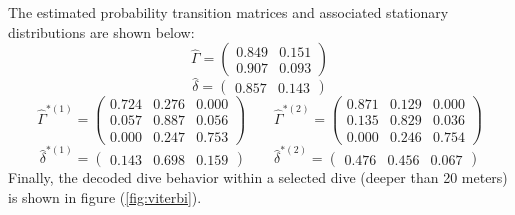 %
The estimated probability transition matrices and associated stationary distributions are shown below:
%
$$\hat \Gamma = \begin{pmatrix} 
0.849 & 0.151 \\
0.907 & 0.093
\end{pmatrix}$$
$$\hat \delta = \begin{pmatrix} 0.857 & 0.143 \end{pmatrix}$$
%
$$\hat \Gamma^{*(1)} = \begin{pmatrix} 
0.724 & 0.276 & 0.000 \\
0.057 & 0.887 & 0.056 \\
0.000 & 0.247 & 0.753
\end{pmatrix} \qquad 
\hat \Gamma^{*(2)} = \begin{pmatrix} 
0.871 & 0.129 & 0.000 \\
0.135 & 0.829 & 0.036 \\
0.000 & 0.246 & 0.754
\end{pmatrix}$$
$$\hat \delta^{*(1)} = \begin{pmatrix} 0.143 & 0.698 & 0.159 \end{pmatrix} \qquad
\hat \delta^{*(2)} = \begin{pmatrix} 0.476 & 0.456 & 0.067 \end{pmatrix}$$
%
Finally, the decoded dive behavior within a selected dive (deeper than 20 meters) is shown in figure (\ref{fig:viterbi}).

